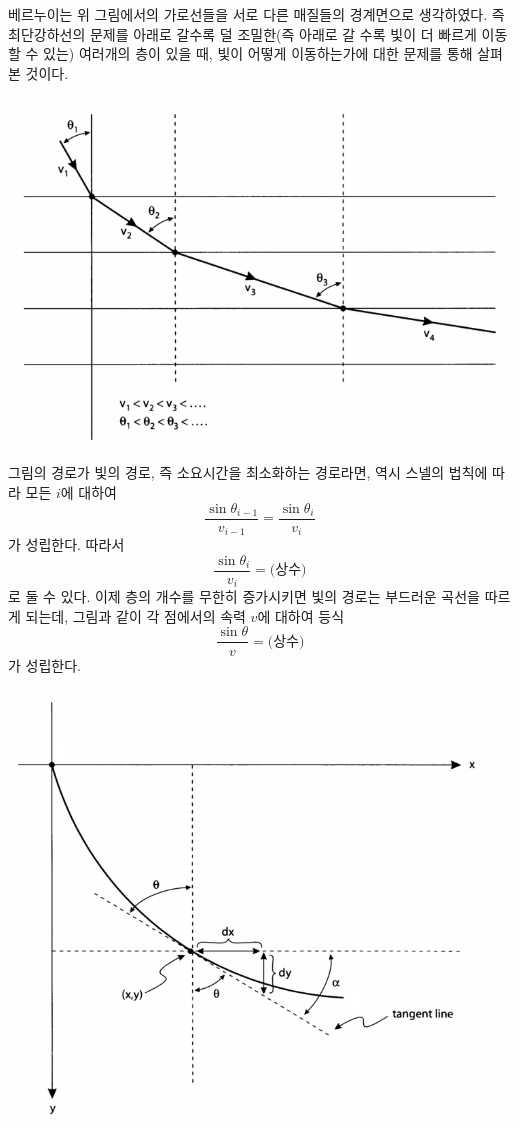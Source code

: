 베르누이는 위 그림에서의 가로선들을 서로 다른 매질들의 경계면으로 생각하였다. 즉 최단강하선의 문제를 아래로 갈수록 덜 조밀한(즉 아래로 갈 수록 빛이 더 빠르게 이동할 수 있는) 여러개의 층이 있을 때, 빛이 어떻게 이동하는가에 대한 문제를 통해 살펴본 것이다.

\begin{center}
\includegraphics[width=.8\textwidth]{images/bernsol02}
\end{center}

그림의 경로가 빛의 경로, 즉 소요시간을 최소화하는 경로라면, 역시 스넬의 법칙에 따라 모든 $i$에 대하여
\[
\frac{\sin\theta_{i-1}}{v_{i-1}}=\frac{\sin\theta_i}{v_i}
\]
가 성립한다. 따라서
\[
\frac{\sin\theta_i}{v_i}=\mbox{(상수)}
\]
로 둘 수 있다. 이제  층의 개수를 무한히 증가시키면 빛의 경로는 부드러운 곡선을 따르게 되는데, 그림과 같이 각 점에서의 속력 $v$에 대하여 등식
\begin{equation}\label{eq:snellslaw}
\frac{\sin\theta}{v}=\mbox{(상수)}
\end{equation}
가 성립한다.

\begin{center}
\includegraphics[width=.7\textwidth]{images/bernsol03}
\end{center}

